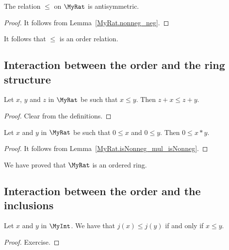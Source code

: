 \begin{lemma}
    \label{MyRat.le_antisymm}
    \leanok
    The relation $\leq$ on $\MyRat$ is antisymmetric.
\end{lemma}
\begin{proof}
    \leanok
    It follows from Lemma~\ref{MyRat.nonneg_neg}.
\end{proof}

It follows that $\leq$ is an order relation.


\subsection{Interaction between the order and the ring structure}

\begin{lemma}
    \label{MyRat.add_le_add_left}
    \leanok
    Let $x$, $y$ and $z$ in $\MyRat$ be such that $x \leq y$. Then $z + x ≤ z + y$.
\end{lemma}
\begin{proof}
    \leanok
    Clear from the definitions.
\end{proof}

\begin{lemma}
    \label{MyRat.mul_nonneg}
    \leanok
    Let $x$ and $y$ in $\MyRat$ be such that $0 \leq x$ and $0 \leq y$. Then $0 \leq x * y$.
\end{lemma}
\begin{proof}
    \leanok
    It follows from Lemma~\ref{MyRat.isNonneg_mul_isNonneg}.
\end{proof}

We have proved that $\MyRat$ is an ordered ring.

\subsection{Interaction between the order and the inclusions}

\begin{lemma}
    \label{MyRat.j_le_iff}
    \leanok
    Let $x$ and $y$ in $\MyInt$. We have that $j(x) \leq j(y)$ if and only if $x \leq y$.
\end{lemma}
\begin{proof}
    \leanok
    Exercise.
\end{proof}

